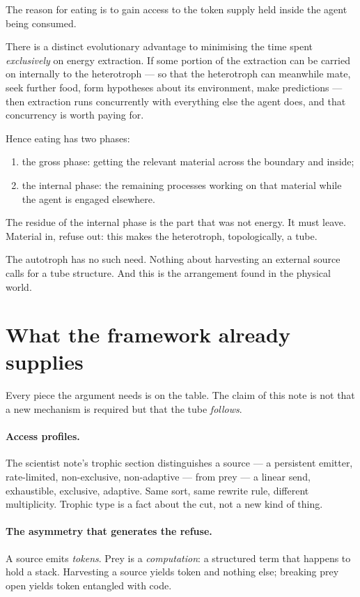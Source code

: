 \documentclass[11pt]{article}
\theoremstyle{plain}
\theoremstyle{definition}
\begin{document}
The reason for eating is to gain access to the token supply held inside the agent being consumed.

There is a distinct evolutionary advantage to minimising the time spent \emph{exclusively} on energy
extraction. If some portion of the extraction can be carried on internally to the heterotroph --- so
that the heterotroph can meanwhile mate, seek further food, form hypotheses about its environment,
make predictions --- then extraction runs concurrently with everything else the agent does, and that
concurrency is worth paying for.

Hence eating has two phases:
\begin{enumerate}
\item the gross phase: getting the relevant material across the boundary and inside;
\item the internal phase: the remaining processes working on that material while the agent is engaged
elsewhere.
\end{enumerate}

The residue of the internal phase is the part that was not energy. It must leave. Material in, refuse
out: this makes the heterotroph, topologically, a tube.

The autotroph has no such need. Nothing about harvesting an external source calls for a tube
structure. And this is the arrangement found in the physical world.

\section{What the framework already supplies}
\label{sec:imports}

Every piece the argument needs is on the table. The claim of this note is not that a new mechanism is
required but that the tube \emph{follows}.

\paragraph{Access profiles.} The scientist note's trophic section distinguishes a source --- a
persistent emitter, rate-limited, non-exclusive, non-adaptive --- from prey --- a linear send,
exhaustible, exclusive, adaptive. Same sort, same rewrite rule, different multiplicity. Trophic type
is a fact about the cut, not a new kind of thing.

\paragraph{The asymmetry that generates the refuse.} A source emits \emph{tokens}. Prey is a
\emph{computation}: a structured term that happens to hold a stack. Harvesting a source yields token
and nothing else; breaking prey open yields token entangled with code.
\end{document}
